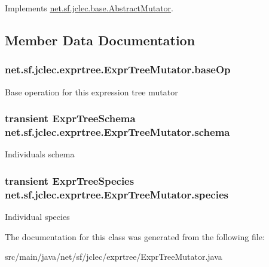 Implements \hyperlink{classnet_1_1sf_1_1jclec_1_1base_1_1_abstract_mutator_ad12e6a2be8fb6082255ce8f399c9b166}{net.\-sf.\-jclec.\-base.\-Abstract\-Mutator}.



\subsection{Member Data Documentation}
\hypertarget{classnet_1_1sf_1_1jclec_1_1exprtree_1_1_expr_tree_mutator_afe98b10b638ef653fe71286d82d2fd93}{
\subsubsection[{base\-Op}]{ net.\-sf.\-jclec.\-exprtree.\-Expr\-Tree\-Mutator.\-base\-Op\hspace{0.3cm}{\ttfamily [protected]}}}\label{classnet_1_1sf_1_1jclec_1_1exprtree_1_1_expr_tree_mutator_afe98b10b638ef653fe71286d82d2fd93}
Base operation for this expression tree mutator \hypertarget{classnet_1_1sf_1_1jclec_1_1exprtree_1_1_expr_tree_mutator_a6b74df0f0bd4fe92c33d84308a8b002d}{
\subsubsection[{schema}]{\setlength{\rightskip}{0pt plus 5cm}transient {\bf Expr\-Tree\-Schema} net.\-sf.\-jclec.\-exprtree.\-Expr\-Tree\-Mutator.\-schema\hspace{0.3cm}{\ttfamily [protected]}}}\label{classnet_1_1sf_1_1jclec_1_1exprtree_1_1_expr_tree_mutator_a6b74df0f0bd4fe92c33d84308a8b002d}
Individuals schema \hypertarget{classnet_1_1sf_1_1jclec_1_1exprtree_1_1_expr_tree_mutator_a45ee9a1b04a9a6d880993e17ee60bf7d}{
\subsubsection[{species}]{\setlength{\rightskip}{0pt plus 5cm}transient {\bf Expr\-Tree\-Species} net.\-sf.\-jclec.\-exprtree.\-Expr\-Tree\-Mutator.\-species\hspace{0.3cm}{\ttfamily [protected]}}}\label{classnet_1_1sf_1_1jclec_1_1exprtree_1_1_expr_tree_mutator_a45ee9a1b04a9a6d880993e17ee60bf7d}
Individual species 

The documentation for this class was generated from the following file\-:\begin{DoxyCompactItemize}
\item 
src/main/java/net/sf/jclec/exprtree/Expr\-Tree\-Mutator.\-java\end{DoxyCompactItemize}
